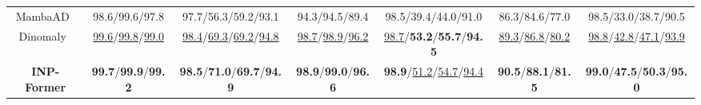 \documentclass[letterpaper]{article} %
\begin{document}
\begin{table*}[!ht]
{{\begin{tabular}{c|cccccc}
MambaAD~\cite{he2024mambaad}    & 98.6/99.6/97.8 & \multicolumn{1}{c|}{97.7/56.3/59.2/93.1} & 94.3/94.5/89.4 & \multicolumn{1}{c|}{98.5/39.4/44.0/91.0}                         & 86.3/84.6/77.0 & 98.5/33.0/38.7/90.5 \\
Dinomaly~\cite{guo2024dinomaly}   & \underline{99.6}/\underline{99.8}/\underline{99.0} & \multicolumn{1}{c|}{\underline{98.4}/\underline{69.3}/\underline{69.2}/\underline{94.8}}                         & \underline{98.7}/\underline{98.9}/\underline{96.2} & \multicolumn{1}{c|}{\underline{98.7}/\textbf{53.2}/\textbf{55.7}/\textbf{94.5}}                         & \underline{89.3}/\underline{86.8}/\underline{80.2} & \underline{98.8}/\underline{42.8}/\underline{47.1}/\underline{93.9} \\ \midrule
\rowcolor{Light}
\textbf{INP-Former} & \textbf{99.7}/\textbf{99.9}/\textbf{99.2} & \multicolumn{1}{c|}{\cellcolor{Light}\textbf{98.5}/\textbf{71.0}/\textbf{69.7}/\textbf{94.9}} & \textbf{98.9}/\textbf{99.0}/\textbf{96.6} & \multicolumn{1}{c|}{\cellcolor{Light}\textbf{98.9}/\underline{51.2}/\underline{54.7}/\underline{94.4}} & \textbf{90.5}/\textbf{88.1}/\textbf{81.5} & \textbf{99.0}/\textbf{47.5}/\textbf{50.3}/\textbf{95.0} \\ \bottomrule[1.5pt]
\end{tabular}}}
\vspace{-3mm}
\end{table*}
\end{document}
